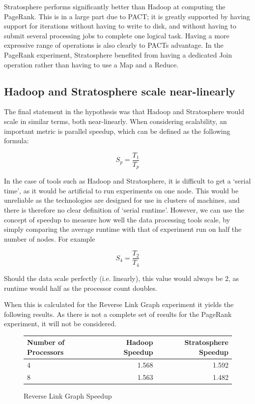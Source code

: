 Stratosphere performs significantly better than Hadoop at computing the PageRank. This is in a large part due to PACT; it is greatly supported by having support for iterations without having to write to disk, and without having to submit several processing jobs to complete one logical task. Having a more expressive range of operations is also clearly to PACTs advantage. In the PageRank experiment, Stratosphere benefited from having a dedicated Join operation rather than having to use a Map and a Reduce. 

\subsection{Hadoop and Stratosphere scale near-linearly}
The final statement in the hypothesis was that Hadoop and Stratosphere would scale in similar terms, both near-linearly. When considering scalability, an important metric is parallel speedup, which can be defined as the following formula:

$$S_{p} = \frac{T_{1}}{T_{p}}$$

In the case of tools such as Hadoop and Stratosphere, it is difficult to get a `serial time', as it would be artificial to run experiments on one node. This would be unreliable as the technologies are designed for use in clusters of machines, and there is therefore no clear definition of `serial runtime'. However, we can use the concept of speedup to measure how well the data processing tools scale, by simply comparing the average runtime with that of experiment run on half the number of nodes. For example

$$ S_{4} = \frac{T_{2}}{T_{4}} $$

Should the data scale perfectly (i.e. linearly), this value would always be $2$, as runtime would half as the processor count doubles. 

When this is calculated for the Reverse Link Graph experiment it yields the following results. As there is not a complete set of results for the PageRank experiment, it will not be considered.

\begin{figure}[H]
\centering
	\begin{tabular}{lrr}
		\toprule
		Number of Processors & Hadoop Speedup & Stratosphere Speedup\\
		\midrule

		4 & 1.568 & 1.592\\
		8 & 1.563 & 1.482 \\
		\bottomrule
	\end{tabular}
	\caption{Reverse Link Graph Speedup}
\end{figure}

